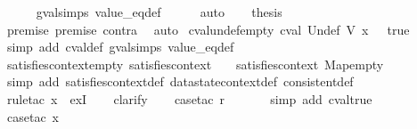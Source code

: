 \begin{isabellebody}
\ \ \ \ \isamarkupfalse%
\ gval{\isachardot}simps\ value_eq{\isacharunderscore}def\isanewline
\ \ \ \ \isamarkupfalse%
\ auto\isanewline
\ \ \isamarkupfalse%
\ {\isacharquery}thesis\isanewline
\ \ \ \ \isamarkupfalse%
\ premise{}\ premise{}\ contra\ \isamarkupfalse%
\ auto\isanewline
{}\isamarkupfalse%
%
\endisatagproof
{\isafoldproof}%
%
\isadelimproof
\isanewline
%
\endisadelimproof
\isanewline
{}\isamarkupfalse%
\ cval{\isacharunderscore}undef{\isacharunderscore}empty{\isacharcolon}\ {\isachardoublequoteopen}cval\ Undef\ {\isacharparenleft}V\ x{\isacharparenright}\ {\isacharless}{\isachargreater}\ {\isacharequal}\ true{\isachardoublequoteclose}\isanewline
%
\isadelimproof
\ \ %
\endisadelimproof
%
\isatagproof
{}\isamarkupfalse%
\ {\isacharparenleft}simp\ add{\isacharcolon}\ cval{\isacharunderscore}def\ gval{\isachardot}simps\ value_eq{\isacharunderscore}def{\isacharparenright}%
\endisatagproof
{\isafoldproof}%
%
\isadelimproof
\isanewline
%
\endisadelimproof
\isanewline
{}\isamarkupfalse%
\ satisfies{\isacharunderscore}context{\isacharunderscore}empty{\isacharcolon}\ {\isachardoublequoteopen}satisfies{\isacharunderscore}context\ {\isacharless}{\isachargreater}\ {\isasymlbrakk}{\isasymrbrakk}\ {\isasymand}\ satisfies{\isacharunderscore}context\ Map{\isachardot}empty\ {\isasymlbrakk}{\isasymrbrakk}{\isachardoublequoteclose}\isanewline
%
\isadelimproof
\ \ %
\endisadelimproof
%
\isatagproof
{}\isamarkupfalse%
\ {\isacharparenleft}simp\ add{\isacharcolon}\ satisfies{\isacharunderscore}context{\isacharunderscore}def\ datastate{}context{\isacharunderscore}def\ consistent{\isacharunderscore}def{\isacharparenright}\isanewline
\ \ \isamarkupfalse%
\ {\isacharparenleft}rule{\isacharunderscore}tac\ x{\isacharequal}{\isachardoublequoteopen}{\isacharless}{\isachargreater}{\isachardoublequoteclose}\ \ exI{\isacharparenright}\isanewline
\ \ \isamarkupfalse%
\ clarify\isanewline
\ \ \isamarkupfalse%
\ {\isacharparenleft}case{\isacharunderscore}tac\ r{\isacharparenright}\isanewline
\ \ \ \ \ \isamarkupfalse%
\ {\isacharparenleft}simp\ add{\isacharcolon}\ cval{\isacharunderscore}true{\isacharparenright}\isanewline
\ \ \ \ \isamarkupfalse%
\ {\isacharparenleft}case{\isacharunderscore}tac\ x{}{\isacharparenright}\isanewline
\ \ \ \ \ \isamarkupfalse%

\end{isabellebody}
